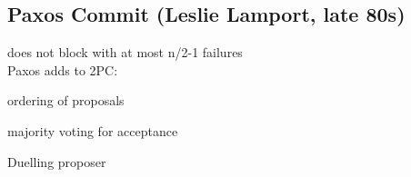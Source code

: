 \subsection{Paxos Commit (Leslie Lamport, late 80s)}
	\begin{compactitem}
		\item does not block with at most n/2-1 failures\\
		Paxos adds to 2PC:
		\begin{compactitem}
			\item ordering of proposals
			\item majority voting for acceptance
		\end{compactitem}
		Duelling proposer
	\end{compactitem}



